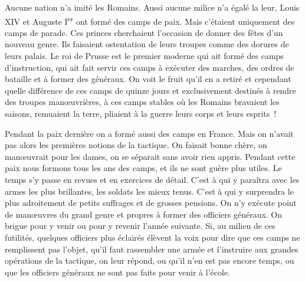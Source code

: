 \documentclass[french,twoside]{book} %
\begin{document}
Aucune nation n’a imité les Romains. Aussi aucune milice n’a égalé la leur, Louis XIV et Auguste I\textsuperscript{er} ont formé des camps de paix. Mais c’étaient uniquement des camps de parade. Ces princes cherchaient l’occasion de donner des fêtes d’un nouveau genre. Ils faisaient ostentation de leurs troupes comme des dorures de leurs palais. Le roi de Prusse est le premier moderne qui ait formé des camps d’instruction, qui ait fait servir ces camps à exécuter des marches, des ordres de bataille et à former des généraux. On voit le fruit qu’il en a retiré et cependant quelle différence de ces camps de quinze jours et exclusivement destinés à rendre des troupes manœuvrières, à ces camps stables où les Romains bravaient les saisons, remuaient la terre, pliaient à la guerre leurs corps et leurs esprits !\par
Pendant la paix dernière on a formé aussi des camps en France. Mais on n’avait pas alors les premières notions de la tactique. On faisait bonne chère, on manœuvrait pour les dames, on se séparait sans avoir rien appris. Pendant cette paix nous formons tous les ans des camps, et ils ne sont guère plus utiles. Le temps s’y passe en revues et en exercices de détail. C’est à qui y paraîtra avec les armes les plus brillantes, les soldats les mieux tenus. C’est à qui y surprendra le plus adroitement de petits suffrages et de grosses pensions. On n’y exécute point de manœuvres du grand genre et propres à former des officiers généraux. On brigue pour y venir ou pour y revenir l’année suivante. Si, au milieu de ces futilités, quelques officiers plus éclairés élèvent la voix pour dire que ces camps ne remplissent pas l’objet, qu’il faut rassembler une armée et l’instruire aux grandes opérations de la tactique, on leur répond, ou qu’il n’en est pas encore temps, ou que les officiers généraux ne sont pas faits pour venir à l’école.
\end{document}
